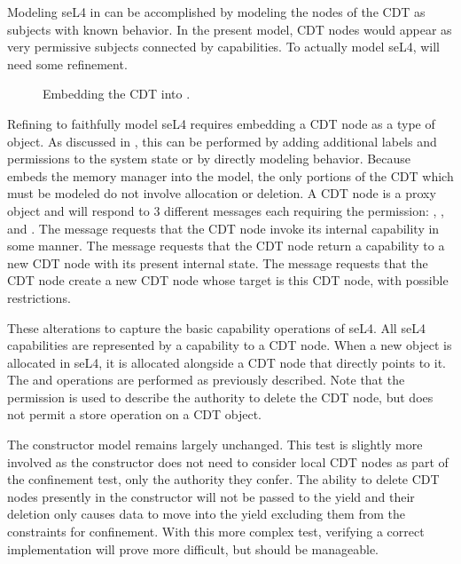 Modeling seL4 in \TMmodelName{} can be accomplished by modeling the nodes of the CDT as subjects with known behavior.
In the present model, CDT nodes would appear as very permissive subjects connected by \COQtx{} capabilities.
To actually model seL4, \TMmodelName{} will need some refinement.

\begin{figure}
  \FIGcdtFix{}
  \caption{Embedding the CDT into \TMmodelName{}.\label{fig:related:sel4toSDM}}
\end{figure}

Refining \TMmodelName{} to faithfully model seL4 requires embedding a CDT node as a type of object.
As discussed in , this can be performed by adding additional labels and permissions to the system state or by directly modeling \COQsend{} behavior.
Because \TMmodelName{} embeds the memory manager into the model, the only portions of the CDT which must be modeled do not involve allocation or deletion.
A CDT node is a proxy object and will respond to 3 different messages each requiring the \NMtx{} permission: , , and .
The  message requests that the CDT node invoke its internal capability in some manner.
The  message requests that the CDT node return a capability to a new CDT node with its present internal state.
The  message requests that the CDT node create a new CDT node whose target is this CDT node, with possible restrictions.

These alterations to \TMmodelName{} capture the basic capability operations of seL4.
All seL4 capabilities are represented by a capability to a CDT node.
When a new object is allocated in seL4, it is allocated alongside a CDT node that directly points to it.
The  and  operations are performed as previously described.
Note that the \NMwr{} permission is used to describe the authority to delete the CDT node, but does not permit a store operation on a CDT object.

The constructor model remains largely unchanged.
This test is slightly more involved as the constructor does not need to consider local CDT nodes as part of the confinement test, only the authority they confer.
The ability to delete CDT nodes presently in the constructor will not be passed to the yield and their deletion only causes data to move into the yield excluding them from the constraints for confinement.
With this more complex test, verifying a correct implementation will prove more difficult, but should be manageable.

